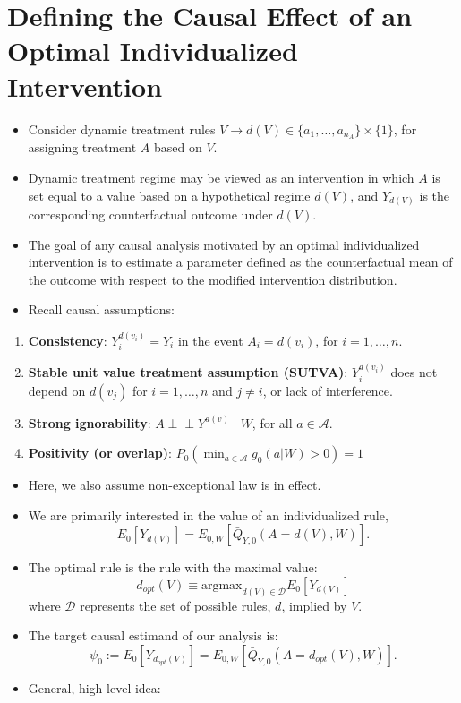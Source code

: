 \documentclass[
  12pt, krantz2,
]{book}
\providecommand{\tightlist}{%
  \setlength{\itemsep}{0pt}\setlength{\parskip}{0pt}}
\theoremstyle{definition}
\theoremstyle{definition}
\theoremstyle{definition}
\newcommand{\1}{\mathbbm{1}}
\begin{document}
\hypertarget{defining-the-causal-effect-of-an-optimal-individualized-intervention}{%
\section{Defining the Causal Effect of an Optimal Individualized Intervention}\label{defining-the-causal-effect-of-an-optimal-individualized-intervention}}

\begin{itemize}
\item
  Consider dynamic treatment rules \(V \rightarrow d(V) \in \{a_1, \ldots, a_{n_A} \} \times \{1\}\),
  for assigning treatment \(A\) based on \(V\).
\item
  Dynamic treatment regime may be viewed as an intervention in which
  \(A\) is set equal to a value based on a hypothetical regime \(d(V)\), and \(Y_{d(V)}\)
  is the corresponding counterfactual outcome under \(d(V)\).
\item
  The goal of any causal analysis motivated by an optimal individualized
  intervention is to estimate a parameter defined as the counterfactual mean of the outcome with
  respect to the modified intervention distribution.
\item
  Recall causal assumptions:
\end{itemize}

\begin{enumerate}
\def\labelenumi{\arabic{enumi}.}
\tightlist
\item
  \textbf{Consistency}: \(Y^{d(v_i)}_i = Y_i\) in the event \(A_i = d(v_i)\),
  for \(i = 1, \ldots, n\).
\item
  \textbf{Stable unit value treatment assumption (SUTVA)}: \(Y^{d(v_i)}_i\) does
  not depend on \(d(v_j)\) for \(i = 1, \ldots, n\) and \(j \neq i\), or lack
  of interference.
\item
  \textbf{Strong ignorability}: \(A \perp \!\!\! \perp Y^{d(v)} \mid W\), for all \(a \in \mathcal{A}\).
\item
  \textbf{Positivity (or overlap)}: \(P_0(\min_{a \in \mathcal{A}} g_0(a|W) > 0)=1\)
\end{enumerate}

\begin{itemize}
\item
  Here, we also assume non-exceptional law is in effect.
\item
  We are primarily interested in the value of an individualized rule,
  \[E_0[Y_{d(V)}] = E_{0,W}[\bar{Q}_{Y,0}(A=d(V),W)].\]
\item
  The optimal rule is the rule with the maximal value:
  \[d_{opt}(V) \equiv \text{argmax}_{d(V) \in \mathcal{D}} E_0[Y_{d(V)}] \]
  where \(\mathcal{D}\) represents the set of possible rules, \(d\), implied by \(V\).
\item
  The target causal estimand of our analysis is:
  \[\psi_0 := E_0[Y_{d_{opt}(V)}] =  E_{0,W}[\bar{Q}_{Y,0}(A=d_{opt}(V),W)].\]
\item
  General, high-level idea:
\end{itemize}
\end{document}
